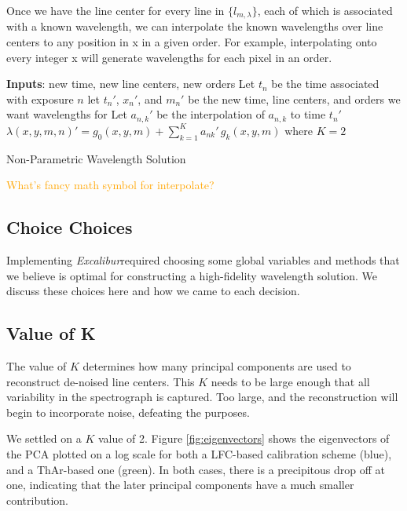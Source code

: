 \documentclass[12pt, letterpaper]{article}
\newcommand{\lz}[1]{\textcolor{orange}{#1}}
\newcommand{\project}[1]{\textsl{#1}}
\newcommand{\name}{\project{Excalibur}}
\begin{document}
Once we have the line center for every line in $\{l_{m,\lambda}\}$, each of which is associated with a known wavelength, we can interpolate the known wavelengths over line centers to any position in x in a given order.  For example, interpolating onto every integer x will generate wavelengths for each pixel in an order.

\begin{algorithm}
\SetAlgoLined
\textbf{Inputs}: new time, new line centers, new orders\; %
Let $t_n$ be the time associated with exposure $n$\;
let $t_n'$, $x_n'$, and $m_n'$ be the new time, line centers, and orders we want wavelengths for\;
Let $a_{n,k}'$ be the interpolation of $a_{n,k}$ to time $t_n'$\;
$\lambda(x,y,m,n)' = g_0(x,y,m) + \sum_{k=1}^K a_{nk}'\,g_k(x,y,m)$ where $K=2$\;
\caption{Non-Parametric Wavelength Solution}
\end{algorithm}
\lz{What's fancy math symbol for interpolate?}

\subsection{Choice Choices} \label{sec:choices}
Implementing \name required choosing some global variables and methods that we believe is optimal for constructing a high-fidelity wavelength solution.  We discuss these choices here and how we came to each decision.

\subsection{Value of K}
The value of $K$ determines how many principal components are used to reconstruct de-noised line centers.  This $K$ needs to be large enough that all variability in the spectrograph is captured.  Too large, and the reconstruction will begin to incorporate noise, defeating the purposes.

We settled on a $K$ value of 2.  Figure \ref{fig:eigenvectors} shows the eigenvectors of the PCA plotted on a log scale for both a LFC-based calibration scheme (blue), and a ThAr-based one (green).  In both cases, there is a precipitous drop off at one, indicating that the later principal components have a much smaller contribution.
\end{document}
